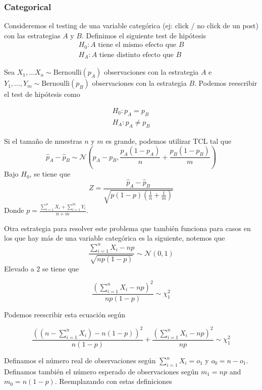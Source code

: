 \subsubsection{Categorical}

Consideremos el testing de una variable categórica (ej: click / no click de un post) con las estrategias $A$ y $B$. Definimos el siguiente test de hipótesis 
\begin{equation*}
\begin{aligned}
    H_0: A \text{ tiene el mismo efecto que } B \\ 
    H_A: A \text{ tiene distinto efecto que } B
\end{aligned}
\end{equation*}

Sea $X_1 , \dots X_n \sim \text{Bernoulli}(p_A)$ observaciones con la estrategia $A$ e $Y_1, \dots, Y_m \sim \text{Bernoulli}(p_B)$ observaciones con la estrategia $B$. Podemos reescribir el test de hipótesis como 

\begin{equation*}
\begin{aligned}
    H_0: p_A = p_B \\ 
    H_A: p_A \neq p_B
\end{aligned}
\end{equation*}

Si el tamaño de muestras $n$ y $m$ es grande, podemos utilizar TCL tal que 
$$
\hat{p}_A - \hat{p}_B \sim \mathcal{N} \left ( p_A - p_B , \frac{p_A(1-p_A)}{n} + \frac{p_B(1-p_B)}{m} \right )
$$
Bajo $H_0$, se tiene que 
$$
Z = \frac{\hat{p}_A - \hat{p}_B}{\sqrt{p(1-p)\left ( \frac{1}{n} + \frac{1}{m} \right )}}
$$
Donde $p = \frac{\sum_{i=1}^n X_i + \sum_{i=1}^m Y_i}{n + m}$.

Otra estrategia para resolver este problema que también funciona para casos en los que hay más de una variable categórica es la siguiente, notemos que 
$$
\frac{\sum_{i=1}^{n}X_i - np}{\sqrt{np(1-p)}} \sim \mathcal{N}(0, 1)
$$
Elevado a 2 se tiene que 

$$ \frac{(\sum_{i=1}^{n}X_i - np)^2}{np(1-p)} \sim \chi^2_{1}$$

Podemos reescribir esta ecuación según 

$$ \frac{((n-\sum_{i=1}^n X_i) - n(1-p))^2}{n(1-p)} + \frac{(\sum_{i=1}^n X_i - np)^2}{np} \sim \chi^2_{1}$$

Definamos el número real de observaciones según $\sum_{i=1}^n X_i = o_1$ y $o_0 = n - o_1$. Definamos también el número esperado de observaciones según $m_1 = np$ and $m_0 = n(1-p)$. Reemplazando con estas definiciones

